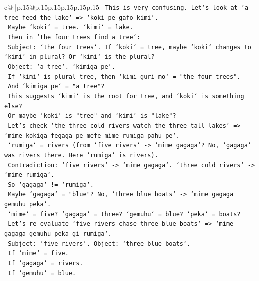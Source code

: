 \documentclass{article}
\begin{document}
{\begin{supertabular}{c@{$\;$}|p{.15\linewidth}@{}p{.15\linewidth}p{.15\linewidth}p{.15\linewidth}p{.15\linewidth}p{.15\linewidth}}
{{{\texttt{                    This is very confusing. Let's look at `a tree feed the lake` => `koki pe gafo kimi`.} \\
\texttt{                    Maybe `koki` = tree. `kimi` = lake.} \\
\texttt{                    Then in `the four trees find a tree`:} \\
\texttt{                    Subject: `the four trees`. If `koki` = tree, maybe `koki` changes to `kimi` in plural? Or `kimi` is the plural?} \\
\texttt{                    Object: `a tree`. `kimiga pe`.} \\
\texttt{                    If `kimi` is plural tree, then `kimi guri mo` = "the four trees".} \\
\texttt{                    And `kimiga pe` = "a tree"?} \\
\texttt{                    This suggests `kimi` is the root for tree, and `koki` is something else?} \\
\texttt{                    Or maybe `koki` is "tree" and `kimi` is "lake"?} \\
\texttt{                    Let's check `the three cold rivers watch the three tall lakes` => `mime kokiga fegaga pe mefe mime rumiga pahu pe`.} \\
\texttt{                    `rumiga` = rivers (from `five rivers` {-}> `mime gagaga`? No, `gagaga` was rivers there. Here `rumiga` is rivers).} \\
\texttt{                    Contradiction: `five rivers` {-}> `mime gagaga`. `three cold rivers` {-}> `mime rumiga`.} \\
\texttt{                    So `gagaga` != `rumiga`.} \\
\texttt{                    Maybe `gagaga` = "blue"? No, `three blue boats` {-}> `mime gagaga gemuhu peka`.} \\
\texttt{                    `mime` = five? `gagaga` = three? `gemuhu` = blue? `peka` = boats?} \\
\texttt{                    Let's re{-}evaluate `five rivers chase three blue boats` => `mime gagaga gemuhu peka gi rumiga`.} \\
\texttt{                    Subject: `five rivers`. Object: `three blue boats`.} \\
\texttt{                    If `mime` = five.} \\
\texttt{                    If `gagaga` = rivers.} \\
\texttt{                    If `gemuhu` = blue.} \\
}}}
\end{supertabular}}
\end{document}
